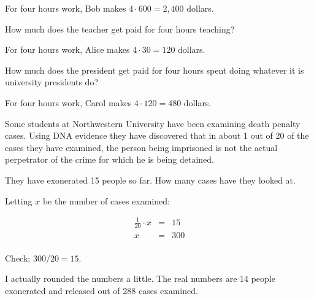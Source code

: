 \documentclass[fleqn,addpoints]{exam}
\begin{document}
\begin{questions}
\begin{parts}
\begin{part}
\begin{solution}
    For four hours work, Bob makes \( 4 \cdot 600 = 2,400 \) dollars.
\end{solution}

\end{part}

\begin{part}
    How much does the teacher get paid for four hours teaching?

\begin{solution}
    For four hours work, Alice makes \( 4 \cdot 30 = 120 \) dollars.
\end{solution}

\end{part}

\begin{part}
    How much does the president get paid for four hours spent doing whatever it is university presidents do?

\begin{solution}
    For four hours work, Carol makes \( 4 \cdot 120 = 480 \) dollars.
\end{solution}
\end{part}

\end{parts}

\question

Some students at Northwestern University have been examining death penalty cases.  Using DNA evidence they have
discovered that in about 1 out of 20 of the cases they have examined, the person being imprisoned is not the actual perpetrator of the
crime for which he is being detained.  

\begin{parts}

\begin{part}
They have exonerated 15 people so far.  How many cases have they looked at.

\begin{solution}
  Letting $x$ be the number of cases examined:

  \begin{eqnarray*}
    \frac{1}{20} \cdot x & = & 15 \\
    x & = & 300 \\
  \end{eqnarray*}

Check: \( 300 / 20 = 15 \).

I actually rounded the numbers a little.  The real numbers are 14 people exonerated and released out of 288 cases examined.


\end{solution}
\end{part}
\end{parts}
\end{questions}
\end{document}
